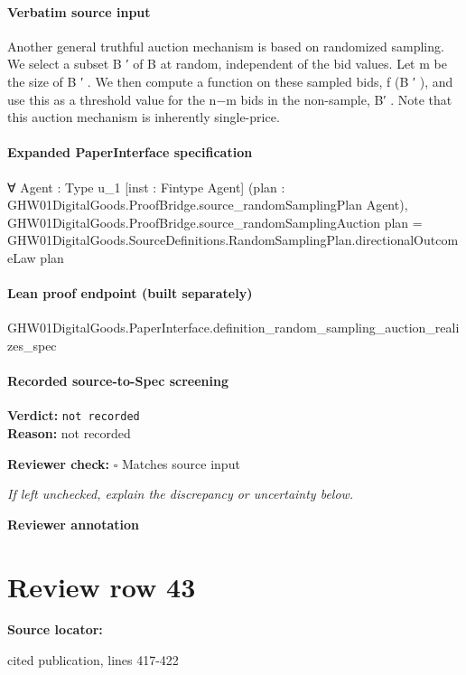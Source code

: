 \documentclass[10pt]{article}
\newcommand{\reviewerbox}{%
  \par\noindent\fbox{\parbox{0.96\linewidth}{\rule{0pt}{0.38in}}}\par
}
\newcommand{\reviewmatch}[1]{%
  \par\noindent\textbf{Reviewer check:} $\square$\; #1\par
  \noindent\emph{If left unchecked, explain the discrepancy or uncertainty below.}\par
}
\begin{document}
\paragraph{Verbatim source input}
\begin{ReviewVerbatim}
Another general truthful auction mechanism is based
on randomized sampling. We select a subset B ′ of B
at random, independent of the bid values. Let m be
the size of B ′ . We then compute a function on these
sampled bids, f (B ′ ), and use this as a threshold value
for the n−m bids in the non-sample, B\B ′ . Note that
this auction mechanism is inherently single-price.
\end{ReviewVerbatim}


\paragraph{Expanded PaperInterface specification}
\begin{ReviewVerbatim}
∀ {Agent : Type u_1} [inst : Fintype Agent] (plan : GHW01DigitalGoods.ProofBridge.source_randomSamplingPlan Agent),
  GHW01DigitalGoods.ProofBridge.source_randomSamplingAuction plan =
    GHW01DigitalGoods.SourceDefinitions.RandomSamplingPlan.directionalOutcomeLaw plan
\end{ReviewVerbatim}

\paragraph{Lean proof endpoint (built separately)}\begin{ReviewVerbatim}
GHW01DigitalGoods.PaperInterface.definition_random_sampling_auction_realizes_spec
\end{ReviewVerbatim}

\paragraph{Recorded source-to-Spec screening}
\textbf{Verdict:} \texttt{not recorded}
\\
\textbf{Reason:} not recorded
\reviewmatch{Matches source input}
\noindent\textbf{Reviewer annotation}\par
\reviewerbox
\clearpage
\hypertarget{source-claim-b7128f52f54f33d4}{}
\section*{Review row 43}
\textbf{Source locator:} {\footnotesize\raggedright cited publication, lines 417-\allowbreak{}422\par}
\end{document}
